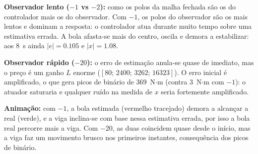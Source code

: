 \documentclass[12pt]{report}
\begin{document}
\textbf{Observador lento ($-1$ vs $-2$):} como os polos da malha fechada são os do controlador mais os do observador. 
Com $-1$, os polos do observador são os mais lentos e dominam a resposta: o controlador atua durante muito tempo sobre uma estimativa errada.
A bola afasta-se mais do centro, oscila e demora a estabilizar: aos 8~s ainda $|e|=0.105$ e $|x|=1.08$.

\textbf{Observador rápido ($-20$):} o erro de estimação anula-se quase de imediato, mas o preço é um ganho $L$ enorme ($[80;\,2400;\,3262;\,16323]$).
O erro inicial é amplificado, o que gera picos de binário de $369$~N$\cdot$m (contra $3$~N$\cdot$m com $-1$): o atuador saturaria e qualquer ruído na medida de $x$ seria fortemente amplificado. 

\textbf{Animação:} com $-1$, a bola estimada (vermelho tracejado) demora a
alcançar a real (verde), e a viga inclina-se com base nessa estimativa
errada, por isso a bola real percorre mais a viga. Com $-20$, as duas
coincidem quase desde o início, mas a viga faz um movimento brusco nos
primeiros instantes, consequência dos picos de binário.

\end{document}
